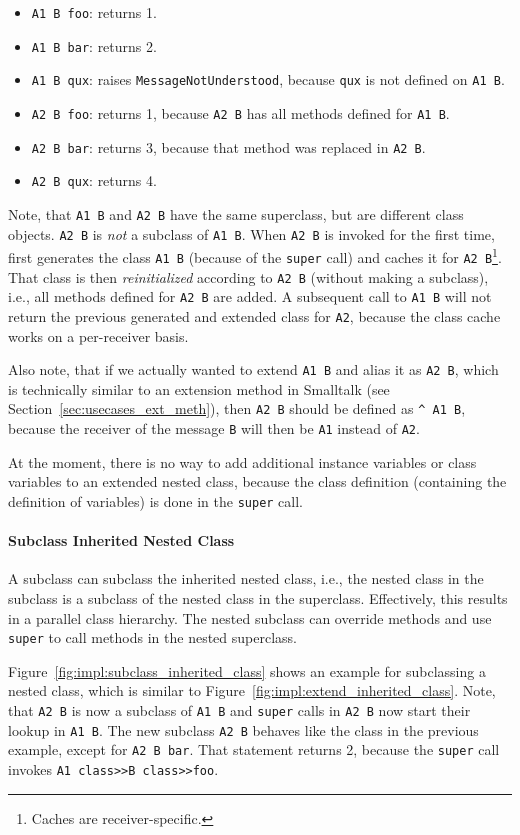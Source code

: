 \begin{itemize}
	\item \texttt{A1 B foo}: returns 1.
	\item \texttt{A1 B bar}: returns 2.
	\item \texttt{A1 B qux}: raises \texttt{MessageNotUnderstood}, because \texttt{qux} is not defined on \texttt{A1 B}.
	\item \texttt{A2 B foo}: returns 1, because \texttt{A2 B} has all methods defined for \texttt{A1 B}.
	\item \texttt{A2 B bar}: returns 3, because that method was replaced in \texttt{A2 B}.
	\item \texttt{A2 B qux}: returns 4.
\end{itemize}

Note, that \texttt{A1 B} and \texttt{A2 B} have the same superclass, but are different class objects. \texttt{A2 B} is \emph{not} a subclass of \texttt{A1 B}. When \texttt{A2 B} is invoked for the first time, \msname first generates the class \texttt{A1 B} (because of the \texttt{super} call) and caches it for \texttt{A2 B}\footnote{Caches are receiver-specific.}. That class is then \emph{reinitialized} according to \texttt{A2 B} (without making a subclass), i.e., all methods defined for \texttt{A2 B} are added. A subsequent call to \texttt{A1 B} will not return the previous generated and extended class for \texttt{A2}, because the class cache works on a per-receiver basis.

Also note, that if we actually wanted to extend \texttt{A1 B} and alias it as \texttt{A2 B}, which is technically similar to an extension method in Smalltalk (see Section~\ref{sec:usecases_ext_meth}), then \texttt{A2 B} should be defined as \texttt{\^{} A1 B}, because the receiver of the message \texttt{B} will then be \texttt{A1} instead of \texttt{A2}. 

At the moment, there is no way to add additional instance variables or class variables to an extended nested class, because the class definition (containing the definition of variables) is done in the \texttt{super} call. 

\paragraph{Subclass Inherited Nested Class}
A subclass can subclass the inherited nested class, i.e., the nested class in the subclass is a subclass of the nested class in the superclass. Effectively, this results in a parallel class hierarchy. The nested subclass can override methods and use \texttt{super} to call methods in the nested superclass.

Figure~\ref{fig:impl:subclass_inherited_class} shows an example for subclassing a nested class, which is similar to Figure~\ref{fig:impl:extend_inherited_class}. Note, that \texttt{A2 B} is now a subclass of \texttt{A1 B} and \texttt{super} calls in \texttt{A2 B} now start their lookup in \texttt{A1 B}. The new subclass \texttt{A2 B} behaves like the class in the previous example, except for \texttt{A2 B bar}. That statement returns 2, because the \texttt{super} call invokes \texttt{A1 class>>B class>>foo}.

